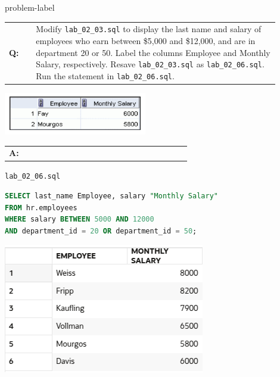 \begin{problem}{}{problem-label}

\begin{tabular}{@{}l p{0.9\linewidth}@{}}
  \textbf{Q:} & Modify \texttt{lab\_02\_03.sql} to display the last name and salary of employees who earn between \$5,000 and \$12,000, and are in department 20 or 50. Label the columns Employee and Monthly Salary, respectively. Resave \texttt{lab\_02\_03.sql} as \texttt{lab\_02\_06.sql}. Run the statement in \texttt{lab\_02\_06.sql}.
\end{tabular}

\begin{center}
  \includegraphics[scale=0.8]{images/c2q6.png}
\end{center}

\begin{tabular}{@{}l p{0.9\linewidth}@{}}
  \textbf{A:} & 
\end{tabular}

\hspace{1.5em}\texttt{lab\_02\_06.sql}
\begin{lstlisting}[language=SQL]
SELECT last_name Employee, salary "Monthly Salary"
FROM hr.employees
WHERE salary BETWEEN 5000 AND 12000
AND department_id = 20 OR department_id = 50;
\end{lstlisting}

\vspace{1em}

\begin{center}
  \includegraphics[scale=0.8]{images/c2a6.png}
\end{center}

\end{problem}

